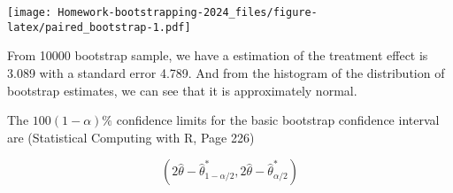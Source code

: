 \documentclass[
]{article}
\newenvironment{Shaded}{\begin{snugshade}}{\end{snugshade}}
\newcommand{\DecValTok}[1]{\textcolor[rgb]{0.00,0.00,0.81}{#1}}
\newcommand{\FloatTok}[1]{\textcolor[rgb]{0.00,0.00,0.81}{#1}}
\newcommand{\FunctionTok}[1]{\textcolor[rgb]{0.13,0.29,0.53}{\textbf{#1}}}
\newcommand{\NormalTok}[1]{#1}
\newcommand{\OtherTok}[1]{\textcolor[rgb]{0.56,0.35,0.01}{#1}}
\newcommand{\SpecialCharTok}[1]{\textcolor[rgb]{0.81,0.36,0.00}{\textbf{#1}}}
\begin{document}
\begin{Shaded}
\end{Shaded}

\texttt{[image: Homework-bootstrapping-2024\_files/figure-latex/paired\_bootstrap-1.pdf]}

From 10000 bootstrap sample, we have a estimation of the treatment
effect is 3.089 with a standard error 4.789. And from the histogram of
the distribution of bootstrap estimates, we can see that it is
approximately normal.

The \(100(1-\alpha)\%\) confidence limits for the basic bootstrap
confidence interval are (Statistical Computing with R, Page 226)

\[(2\hat\theta-\hat\theta^*_{1-\alpha/2}, 2\hat\theta-\hat\theta^*_{\alpha/2})\]
\end{document}
